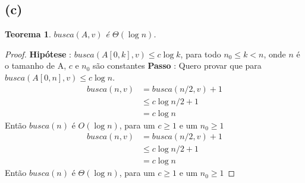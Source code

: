 \documentclass{article}
\begin{document}
\subsection*{(c)}
\newtheorem{teo4}{Teorema}
\begin{teo4}
    $busca(A, v)$ é $\Theta(\log n)$.
\end{teo4}
\begin{proof}
    \hfill \break
    \textbf{Hipótese} : $busca(A[0,k], v) \leq c\log k$, para todo $n_0 \leq k < n$, onde $n$ é o tamanho de A, $c$ e $n_0$ são constantes\newline
    \textbf{Passo} : Quero provar que para $busca(A[0,n], v) \leq c\log n$.\newline
    \hspace*{30pt}
    \begin{equation}
        \begin{split}
        busca(n, v) & = busca(n/2, v) + 1\\
        & \leq c\log n/2 + 1\\
        & = c\log n
        \end{split}
    \end{equation}
    Então $busca(n)$ é $O(\log n)$, para um $c \geq 1$ e um $n_0 \geq 1$
    \begin{equation}
        \begin{split}
            busca(n, v) & = busca(n/2, v) + 1\\
            & \leq c\log n/2 + 1\\
            & = c\log n
        \end{split}
    \end{equation}
    Então $busca(n)$ é $\Theta(\log n)$, para um $c \geq 1$ e um $n_0 \geq 1$
\end{proof}
\end{document}

